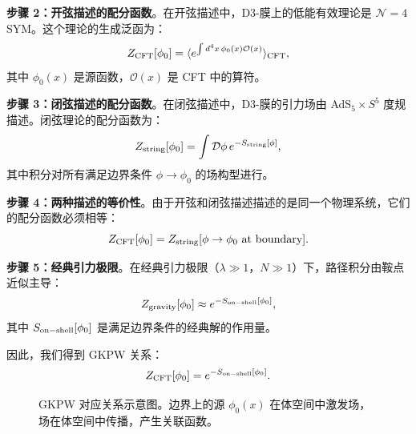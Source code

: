 \textbf{步骤 2：开弦描述的配分函数}。在开弦描述中，D3-膜上的低能有效理论是 $\mathcal{N}=4$ SYM。这个理论的生成泛函为：
\begin{equation}
    Z_{\rm CFT}[\phi_0] = \langle e^{\int d^4 x \, \phi_0(x) \mathcal{O}(x)} \rangle_{\rm CFT},
\end{equation}
其中 $\phi_0(x)$ 是源函数，$\mathcal{O}(x)$ 是 CFT 中的算符。

\textbf{步骤 3：闭弦描述的配分函数}。在闭弦描述中，D3-膜的引力场由 AdS$_5 \times S^5$ 度规描述。闭弦理论的配分函数为：
\begin{equation}
    Z_{\rm string}[\phi_0] = \int \mathcal{D}\phi \, e^{-S_{\rm string}[\phi]},
\end{equation}
其中积分对所有满足边界条件 $\phi \to \phi_0$ 的场构型进行。

\textbf{步骤 4：两种描述的等价性}。由于开弦和闭弦描述描述的是同一个物理系统，它们的配分函数必须相等：
\begin{equation}
    Z_{\rm CFT}[\phi_0] = Z_{\rm string}[\phi \to \phi_0 \text{ at boundary}].
\end{equation}

\textbf{步骤 5：经典引力极限}。在经典引力极限（$\lambda \gg 1$，$N \gg 1$）下，路径积分由鞍点近似主导：
\begin{equation}
    Z_{\rm gravity}[\phi_0] \approx e^{-S_{\rm on-shell}[\phi_0]},
\end{equation}
其中 $S_{\rm on-shell}[\phi_0]$ 是满足边界条件的经典解的作用量。

因此，我们得到 GKPW 关系：
\begin{equation}
    Z_{\rm CFT}[\phi_0] = e^{-S_{\rm on-shell}[\phi_0]}.
\end{equation}

\begin{figure}[htbp]
\centering
{}
\caption{GKPW 对应关系示意图。边界上的源 $\phi_0(x)$ 在体空间中激发场，场在体空间中传播，产生关联函数。}
\label{fig:gkpw_correspondence}
\end{figure}

